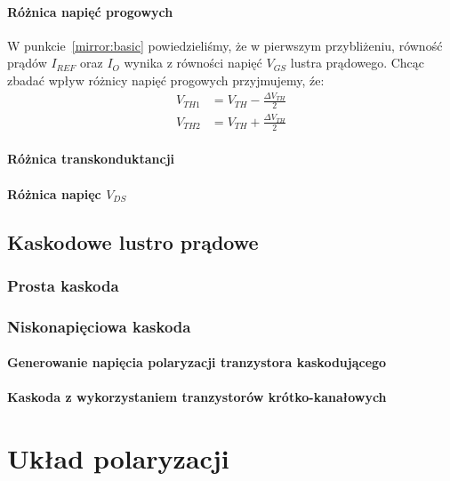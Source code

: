 \documentclass[twoside,pl,final]{labman}
\begin{document}
\subsubsection{Różnica napięć progowych}
\label{mirror:basic:marching:vth}
W punkcie~\ref{mirror:basic} powiedzieliśmy,
że w pierwszym przybliżeniu,
równość prądów $I_{REF}$ oraz $I_O$ wynika z równości napięć $V_{GS}$ lustra prądowego.
Chcąc zbadać wpływ różnicy napięć progowych przyjmujemy, źe:
\begin{eqnarray}
  V_{TH1} &= V_{TH} - \frac{\Delta V_{TH}}{2} \\
  V_{TH2} &= V_{TH} + \frac{\Delta V_{TH}}{2}
\end{eqnarray}


\subsubsection{Różnica transkonduktancji}
\label{mirror:baisc:mathcing:kp}

\subsubsection{Różnica napięc $V_{DS}$}
\label{mirror:basic:matching:vds}

\section{Kaskodowe lustro prądowe}
\label{mirror:cascode}

\subsection{Prosta kaskoda}
\label{mirror:cascode:simple}

\subsection{Niskonapięciowa kaskoda}
\label{mirror:cascode:wideswing}

\subsubsection{Generowanie napięcia polaryzacji tranzystora kaskodującego}
\label{mirror:cascode:wideswing:mws}

\subsubsection{Kaskoda z wykorzystaniem tranzystorów krótko-kanałowych}
\label{mirror:cascode:wideswing:shortchannel}

\chapter{Układ polaryzacji}
\label{bias}



\end{document}
